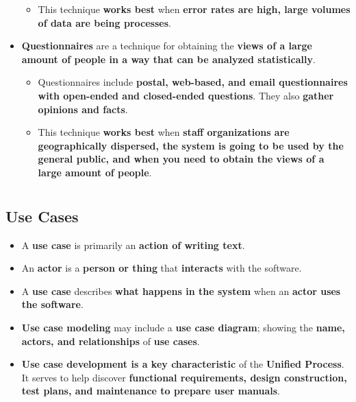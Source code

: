 \documentclass[16pt]{article}
\begin{document}
\begin{itemize}
\begin{itemize}
            \item This technique \textbf{works best} when \textbf{error rates are high, large volumes of data are being processes}.
        \end{itemize}
        \item \textbf{Questionnaires} are a technique for obtaining the \textbf{views of a large amount of people in a way that can be analyzed statistically}.
        \begin{itemize}
            \item Questionnaires include \textbf{postal, web-based, and email questionnaires with open-ended and closed-ended questions}. They also \textbf{gather opinions and facts}.
            \item This technique \textbf{works best} when \textbf{staff organizations are geographically dispersed, the system is going to be used by the general public, and when you need to obtain the views of a large amount of people}.
        \end{itemize}
    \end{itemize}

    \section*{}

    \subsection*{Use Cases}
    \begin{itemize}
        \item A \textbf{use case} is primarily an \textbf{action of writing text}.
        \item An \textbf{actor} is a \textbf{person or thing} that \textbf{interacts} with the software.
        \item A \textbf{use case} describes \textbf{what happens in the system} when an \textbf{actor uses the software}.
        \item \textbf{Use case modeling} may include a \textbf{use case diagram}; showing the \textbf{name, actors, and relationships} of \textbf{use cases}.
        \item \textbf{Use case development is a key characteristic} of the \textbf{Unified Process}. It serves to help discover \textbf{functional requirements, design construction, test plans, and maintenance to prepare user manuals}.
    \end{itemize}
\end{document}
